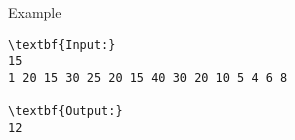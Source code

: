Example
\begin{verbatim}
\textbf{Input:}
15
1 20 15 30 25 20 15 40 30 20 10 5 4 6 8

\textbf{Output:}
12
\end{verbatim}